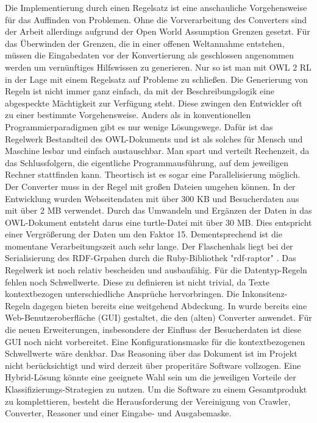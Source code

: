 \documentclass[runningheads,a4paper]{llncs}
\begin{document}
Die Implementierung durch einen Regelsatz ist eine anschauliche Vorgehensweise für das Auffinden von Problemen. 
Ohne die Vorverarbeitung des Converters sind der Arbeit allerdings aufgrund der Open World Assumption Grenzen gesetzt.
Für das Überwinden der Grenzen, die in einer offenen Weltannahme entstehen, müssen die Eingabedaten vor der Konvertierung als geschlossen angenommen werden um vernünftiges Hilfswissen zu generieren.
Nur so ist man mit OWL 2 RL in der Lage mit einem Regelsatz auf Probleme zu schließen.
Die Generierung von Regeln ist nicht immer ganz einfach, da mit der Beschreibungslogik eine abgespeckte Mächtigkeit zur Verfügung steht. 
Diese zwingen den Entwickler oft zu einer bestimmte Vorgehensweise.
Anders als in konventionellen Programmierparadigmen gibt es nur wenige Lösungswege.
Dafür ist das Regelwerk Bestandteil des OWL-Dokuments und ist als solches für Mensch und Maschine lesbar und einfach austauschbar.
Man spart und verteilt Rechenzeit, da das Schlussfolgern, die eigentliche Programmausführung, auf dem jeweiligen Rechner stattfinden kann.
Theortisch ist es sogar eine Parallelisierung möglich.
Der Converter muss in der Regel mit großen Dateien umgehen können.
In der Entwicklung wurden Webseitendaten mit über 300 KB und Besucherdaten aus mit über 2 MB verwendet.
Durch das Umwandeln und Ergänzen der Daten in das OWL-Dokument entsteht darus eine turtle-Datei mit über 30 MB.
Dies entspricht einer Vergrößerung der Daten um den Faktor 15.
Dementsprechend ist die momentane Verarbeitungszeit auch sehr lange.
Der Flaschenhals liegt bei der Serialisierung des RDF-Grpahen durch die Ruby-Bibliothek {}"rdf-raptor{}" \cite{rdf-raptor}.
Das Regelwerk ist noch relativ bescheiden und ausbaufähig.
Für die Datentyp-Regeln fehlen noch Schwellwerte.
Diese zu definieren ist nicht trivial, da Texte kontextbezogen unterschiedliche Ansprüche hervorbringen.
Die Inkonsitenz-Regeln dagegen bieten bereits eine weitgehend Abdeckung. 
In \cite{Brieger} wurde bereits eine Web-Benutzeroberfläche (GUI) gestaltet, die den (alten) Converter anwendet.
Für die neuen Erweiterungen, insbesondere der Einfluss der Besucherdaten ist diese GUI noch nicht vorbereitet.
Eine Konfigurationsmaske für die kontextbezogenen Schwellwerte wäre denkbar.
Das Reasoning über das Dokument ist im Projekt nicht berücksichtigt und wird derzeit über properitäre Software vollzogen.
Eine Hybrid-Lösung könnte eine geeignete Wahl sein um die jeweiligen Vorteile der Klassifizierungs-Strategien zu nutzen.
Um die Software zu einem Gesamtprodukt zu komplettieren, besteht die Herausforderung der Vereinigung von Crawler, Converter, Reasoner und einer Eingabe- und Ausgabemaske.

\nocite{url_dl_primer}



\end{document}
